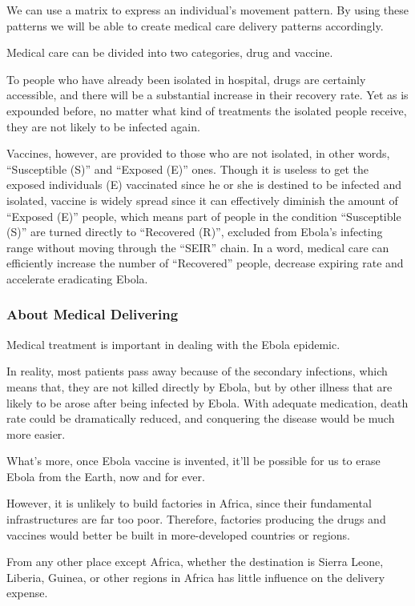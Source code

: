 \documentclass[11pt]{article}
\begin{document}
We can use a matrix to express an individual’s movement pattern. By using these patterns we will be able to create medical care delivery patterns accordingly.

Medical care can be divided into two categories, drug and vaccine.

To people who have already been isolated in hospital, drugs are certainly accessible, and there will be a substantial increase in their recovery rate. Yet as is expounded before, no matter what kind of treatments the isolated people receive, they are not likely to be infected again.

Vaccines, however, are provided to those who are not isolated, in other words, ``Susceptible (S)'' and ``Exposed (E)'' ones. Though it is useless to get the exposed individuals (E) vaccinated since he or she is destined to be infected and isolated, vaccine is widely spread since it can effectively diminish the amount of ``Exposed (E)'' people, which means part of people in the condition ``Susceptible (S)'' are turned directly to ``Recovered (R)'', excluded from Ebola’s infecting range without moving through the ``SEIR'' chain. In a word, medical care can efficiently increase the number of ``Recovered'' people, decrease expiring rate and accelerate eradicating Ebola.


\subsubsection{About Medical Delivering}

Medical treatment is important in dealing with the Ebola epidemic.

In reality, most patients pass away because of the secondary infections, which means that, they are not killed directly by Ebola, but by other illness that are likely to be arose after being infected by Ebola. With adequate medication, death rate could be dramatically reduced, and conquering the disease would be much more easier.

What's more, once Ebola vaccine is invented, it'll be possible for us to erase Ebola from the Earth, now and for ever.

However, it is unlikely to build factories in Africa, since their fundamental infrastructures are far too poor. Therefore, factories producing the drugs and vaccines would better be built in more-developed countries or regions.

From any other place except Africa, whether the destination is Sierra Leone, Liberia, Guinea, or other regions in Africa has little influence on the delivery expense.
\end{document}
